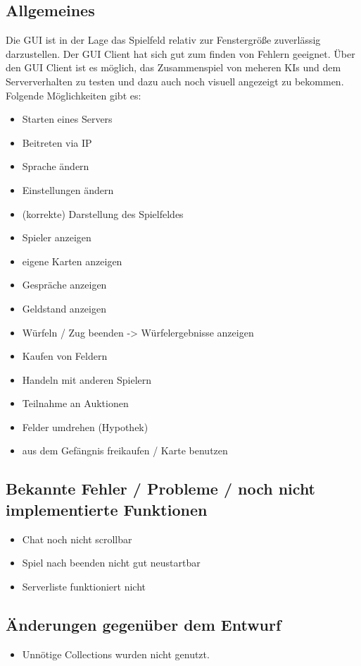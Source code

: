 \documentclass[a4paper,10pt]{article}
\begin{document}
\subsection{Allgemeines}
Die GUI ist in der Lage das Spielfeld relativ zur Fenstergröße zuverlässig darzustellen.
Der GUI Client hat sich gut zum finden von Fehlern geeignet. Über den GUI Client ist es möglich, das Zusammenspiel von meheren KIs und dem Serververhalten zu testen und dazu auch noch visuell angezeigt zu bekommen.
Folgende Möglichkeiten gibt es:
\begin{itemize}
\item Starten eines Servers
\item Beitreten via IP
\item Sprache ändern
\item Einstellungen ändern
\item (korrekte) Darstellung des Spielfeldes
\item Spieler anzeigen
\item eigene Karten anzeigen
\item Gespräche anzeigen
\item Geldstand anzeigen
\item Würfeln / Zug beenden -> Würfelergebnisse anzeigen
\item Kaufen von Feldern
\item Handeln mit anderen Spielern
\item Teilnahme an Auktionen
\item Felder umdrehen (Hypothek)
\item aus dem Gefängnis freikaufen / Karte benutzen
\end{itemize}
\subsection{Bekannte Fehler / Probleme / noch nicht implementierte Funktionen}
\begin{itemize}
\item Chat noch nicht scrollbar
\item Spiel nach beenden nicht gut neustartbar
\item Serverliste funktioniert nicht
\end{itemize}
\subsection{Änderungen gegenüber dem Entwurf}
\begin{itemize}
\item Unnötige Collections wurden nicht genutzt.
\end{itemize}
\end{document}
